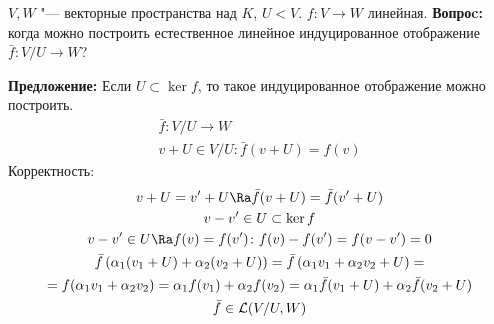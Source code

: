 $V, W$ "--- векторные пространства над $K$, $U < V$.
$f \colon V \to W$ линейная.
\textbf{Вопроc:} когда можно построить естественное линейное индуцированное отображение $\bar f\colon V/U \to W$?

\textbf{Предложение:} Если $U \subset \ker f$, то такое индуцированное отображение можно построить.
\begin{gather*}
	\bar f \colon V/U \to W \\
	v + U \in V/U\colon \bar f(v + U) = f(v)
\end{gather*}
Корректность:
\begin{gather*}
	v + U = v' + U \Ra \bar f(v + U) = \bar f (v' + U) \\
	v - v' \in U \subset \ker f \\
	v - v' \in U \Ra f(v) = f(v')\colon f(v) - f(v') = f(v - v') = 0 \\
	\bar f\left(\alpha_1(v_1 + U) + \alpha_2(v_2 + U)\right) = \bar f\left(\alpha_1 v_1 + \alpha_2 v_2 + U\right) = \\
	= f(\alpha_1 v_1 + \alpha_2 v_2) = \alpha_1 f(v_1) + \alpha_2 f(v_2) = \alpha_1 \bar f(v_1 + U) + \alpha_2\bar f(v_2 + U) \\
	\bar f \in \mathcal{L}(V/U, W)
\end{gather*}
